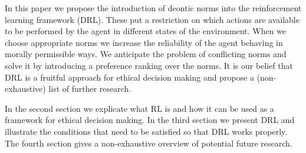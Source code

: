 In this paper we propose the introduction of deontic norms into the reinforcement learning framework (DRL). These put a restriction on which actions are available to be performed by the agent in different states of the environment. When we choose appropriate norms we increase the reliability of the agent behaving in morally permissible ways. We anticipate the problem of conflicting norms and solve it by introducing a preference ranking over the norms. It is our belief that DRL is a fruitful approach for ethical decision making and propose a (non-exhaustive) list of further research.


In the second section we explicate what RL is and how it can be used as a framework for ethical decision making. In the third section we present DRL and illustrate the conditions that need to be satisfied so that DRL works properly. The fourth section gives a non-exhaustive overview of potential future research. 
